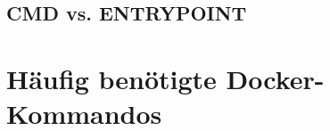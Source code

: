 \subsection{CMD vs. ENTRYPOINT}
\label{sec:cmd-vs-entrypoint}


\section{Häufig benötigte Docker-Kommandos}
\label{docker-kommandos}

